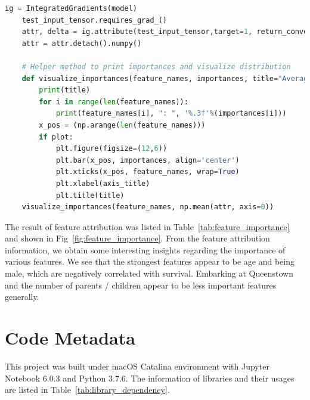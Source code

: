 \documentclass[final-report]{report-template}
\begin{document}
\begin{lstlisting}[language=Python]
    ig = IntegratedGradients(model)
    test_input_tensor.requires_grad_()
    attr, delta = ig.attribute(test_input_tensor,target=1, return_convergence_delta=True)
    attr = attr.detach().numpy()

    # Helper method to print importances and visualize distribution
    def visualize_importances(feature_names, importances, title="Average Feature Importances", plot=True, axis_title="Features"):
        print(title)
        for i in range(len(feature_names)):
            print(feature_names[i], ": ", '%.3f'%(importances[i]))
        x_pos = (np.arange(len(feature_names)))
        if plot:
            plt.figure(figsize=(12,6))
            plt.bar(x_pos, importances, align='center')
            plt.xticks(x_pos, feature_names, wrap=True)
            plt.xlabel(axis_title)
            plt.title(title)
    visualize_importances(feature_names, np.mean(attr, axis=0))
\end{lstlisting}

The result of feature attribution was listed in Table~\ref{tab:feature_importance} and shown in Fig~\ref{fig:feature_importance}.
From the feature attribution information, we obtain some interesting insights regarding the importance of various features. We see that the strongest features appear to be age and being male, which are negatively correlated with survival. Embarking at Queenstown and the number of parents / children appear to be less important features generally.

\begin{table}[]
    \centering
    \caption{Average Feature Importances for each feature}
    \label{tab:feature_importance}
    \end{table}

\section{Code Metadata}
This project was built under macOS Catalina environment with Jupyter Notebook 6.0.3 and Python 3.7.6.
The information of libraries and their usages are listed in Table~\ref{tab:library_dependency}.
\end{document}

